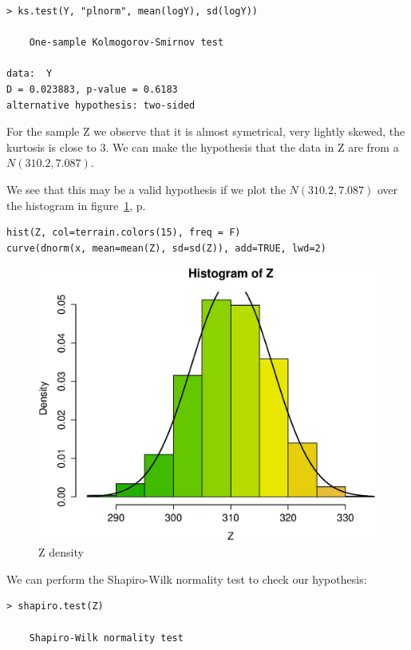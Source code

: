 \documentclass{article}
\begin{document}
\begin{enumerate}
  \begin{lstlisting}
> ks.test(Y, "plnorm", mean(logY), sd(logY))

	One-sample Kolmogorov-Smirnov test

data:  Y
D = 0.023883, p-value = 0.6183
alternative hypothesis: two-sided
  \end{lstlisting}
  
  For the sample Z we observe that it is almost symetrical, very lightly
  skewed, the kurtosis is close to 3. We can make the hypothesis that the data in Z
  are from a $N(310.2, 7.087)$.
  
  We see that this may be a valid hypothesis if we plot the $N(310.2, 7.087)$
  over the histogram in figure~\ref{fig:z}, p.~\pageref{fig:z}
  
  \begin{lstlisting}
hist(Z, col=terrain.colors(15), freq = F)
curve(dnorm(x, mean=mean(Z), sd=sd(Z)), add=TRUE, lwd=2)
  \end{lstlisting}
  
  \begin{figure}[H]
  \centering
  \includegraphics[scale=0.6]{z.eps}
  \caption{Z density}
  \label{fig:z}
  \end{figure}
  
  We can perform the Shapiro-Wilk normality test to check our hypothesis:
  
  \begin{lstlisting}
> shapiro.test(Z)

	Shapiro-Wilk normality test


\end{lstlisting}
\end{enumerate}
\end{document}
